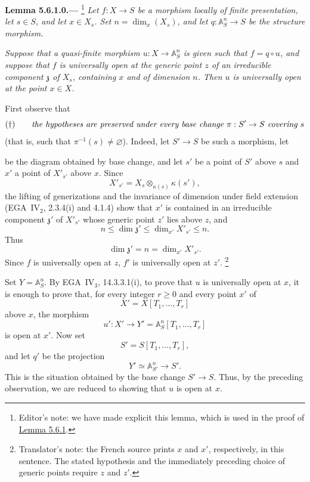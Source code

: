 
\medskip
{}\label{lem:sga3-VIB-5.6.1.0}%
\noindent\textbf{Lemma 5.6.1.0.---}%
\footnote{\label{note:sga3-VIB-39}Editor's note: we have made
explicit this lemma, which is used in the proof of \hyperref[lem:sga3-VIB-5.6.1]{Lemma 5.6.1}.}
\emph{Let \(f:X\to S\) be a morphism locally of finite
presentation, let \(s\in S\), and let \(x\in X_s\). Set
\(n=\dim_x(X_s)\), and let
\(q:\mathbb A^n_S\to S\) be the structure morphism.}

\emph{Suppose that a quasi-finite morphism
\(u:X\to\mathbb A^n_S\) is given such that \(f=q\circ u\), and
suppose that \(f\) is universally open at the generic point \(z\)
of an irreducible component \(\mathfrak z\) of \(X_s\), containing
\(x\) and of dimension \(n\). Then \(u\) is universally open at
the point \(x\in X\).}

First observe that
\[
  (\dagger)\qquad
  \text{\emph{the hypotheses are preserved under every base change
  \(\pi:S'\to S\) covering \(s\)}}
\]
(that is, such that \(\pi^{-1}(s)\ne\varnothing\)).
Indeed, let \(S'\to S\) be such a morphism, let
\begin{center}
  \label{diag:sga3-VIB-5.6.1.0-base-change}%
\end{center}
be the diagram obtained by base change, and let \(s'\) be a point
of \(S'\) above \(s\) and \(x'\) a point of \(X'_{s'}\) above
\(x\). Since
\[
  X'_{s'}=X_s\otimes_{\kappa(s)}\kappa(s'),
\]
the lifting of generizations and the invariance of dimension under
field extension (EGA~IV\(_2\), 2.3.4\textup{(i)} and 4.1.4) show
that \(x'\) is contained in an irreducible component
\(\mathfrak z'\) of \(X'_{s'}\) whose generic point \(z'\) lies
above \(z\), and
\[
  n\leq\dim\mathfrak z'
    \leq\dim_{x'}X'_{s'}\leq n.
\]
Thus
\[
  \dim\mathfrak z'=n=\dim_{x'}X'_{s'}.
\]
Since \(f\) is universally open at \(z\), \(f'\) is universally
open at \(z'\).%
\footnote[1]{\label{note:sga3-VIB-5.6.1.0-generic-points}Translator's
note: the French source prints \(x\) and
\(x'\), respectively, in this sentence. The stated hypothesis and
the immediately preceding choice of generic points require \(z\)
and \(z'\).}

Set \(Y=\mathbb A^n_S\). By EGA~IV\(_3\), 14.3.3.1\textup{(i)},
to prove that \(u\) is universally open at \(x\), it is enough to
prove that, for every integer \(r\geq0\) and every point \(x'\) of
\[
  X'=X[T_1,\ldots,T_r]
\]
above \(x\), the morphism
\[
  u':X'\longrightarrow
  Y'=\mathbb A^n_S[T_1,\ldots,T_r]
\]
is open at \(x'\). Now set
\[
  S'=S[T_1,\ldots,T_r],
\]
and let \(q'\) be the projection
\[
  Y'\simeq\mathbb A^n_{S'}\longrightarrow S'.
\]
This is the situation obtained by the base change \(S'\to S\).
Thus, by the preceding observation, we are reduced to showing that
\(u\) is open at \(x\).

